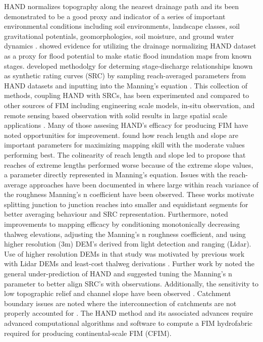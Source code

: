 HAND normalizes topography along the nearest drainage path and its been demonstrated to be a good proxy and indicator of a series of important environmental conditions including soil environments, landscape classes, soil gravitational potentials, geomorphologies, soil moisture, and ground water dynamics \cite{renno2008hand,nobre2011height}. 
 showed evidence for utilizing the drainage normalizing HAND dataset as a proxy for flood potential to make static flood inundation maps from known stages. 
 developed methodolgy for determing stage-discharge relationships known as synthetic rating curves (SRC) by sampling reach-averaged parameters from HAND datasets and inputting into the Manning's equation \cite{gauckler1867etudes,manning1890flow}.
This collection of methods, coupling HAND with SRCs, has been experimented and compared to other sources of FIM including engineering scale models, in-situ observation, and remote sensing based observation with solid results in large spatial scale applications \cite{godbout2019error,johnson2019integrated,garousi2019terrain,nobre2016hand,afshari2018comparison,zheng2018geoflood,teng2015rapid,teng2017flood,zhang2018comparative}.
Many of those assesing HAND's efficacy for producing FIM have noted opportunities for improvement. 
 found how reach length and slope are important parameters for maximizing mapping skill with the moderate values performing best. 
The colinearity of reach length and slope led  to propose that reaches of extreme lengths performed worse because of the extreme slope values, a parameter directly represented in Manning's equation. 
Issues with the reach-average approaches have been documented in  where large within reach variance of the roughness Manning's n coefficient have been observed.
These works motivate splitting junction to junction reaches into smaller and equidistant segments for better averaging behaviour and SRC representation. 
Furthermore,  noted improvements to mapping efficacy by conditioning monotonically decreasing thalweg elevations, adjusting the Manning's n roughness coefficient, and using higher resolution (3m) DEM's derived from light detection and ranging (Lidar).
Use of higher resolution DEMs in that study was motivated by previous work with Lidar DEMs and least-cost thalweg derivations \cite{zheng2018geoflood}.
Further work by  noted the general under-prediction of HAND and suggested tuning the Manning's n parameter to better align SRC's with observations. 
Additionally, the sensitivity to low topographic relief and channel slope have been observed \cite{johnson2019integrated,godbout2019error}. 
Catchment boundary issues are noted where the interconnection of catchments are not properly accounted for \cite{zhang2018comparative,mcgehee2016modified}.
The HAND method and its associated advances require advanced computational algorithms and software to compute a FIM hydrofabric required for producing continental-scale FIM (CFIM).


